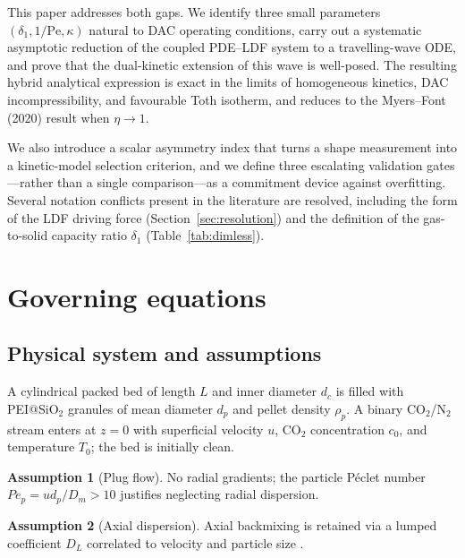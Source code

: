 \documentclass[a4paper]{amsart}
\theoremstyle{definition}
\newtheorem{assumption}{Assumption}
\begin{document}
This paper addresses both gaps.  We identify three small parameters
$(\delta_1, 1/\mathrm{Pe}, \kappa)$ natural to DAC operating conditions, carry out
a systematic asymptotic reduction of the coupled PDE--LDF system to a
travelling-wave ODE, and prove that the dual-kinetic extension of this wave
is well-posed.  The resulting hybrid analytical expression is exact in the
limits of homogeneous kinetics, DAC incompressibility, and favourable Toth
isotherm, and reduces to the Myers--Font (2020) result \cite{MyersFont2020}
when $\eta\to1$.

We also introduce a scalar asymmetry index that turns a shape measurement
into a kinetic-model selection criterion, and we define three escalating
validation gates---rather than a single comparison---as a commitment device
against overfitting.  Several notation conflicts present in the literature are
resolved, including the form of the LDF driving force
(Section~\ref{sec:resolution}) and the definition of the gas-to-solid
capacity ratio $\delta_1$ (Table~\ref{tab:dimless}).

\section{Governing equations}

\subsection{Physical system and assumptions}

A cylindrical packed bed of length $L$ and inner diameter $d_c$ is filled
with PEI@SiO$_2$ granules of mean diameter $d_p$ and pellet density $\rho_p$.
A binary CO$_2$/N$_2$ stream enters at $z=0$ with superficial velocity $u$,
CO$_2$ concentration $c_0$, and temperature $T_0$; the bed is initially
clean.

\begin{assumption}[Plug flow]\label{ass:plug}
No radial gradients; the particle P\'eclet number $Pe_p = ud_p/D_m > 10$
justifies neglecting radial dispersion.
\end{assumption}

\begin{assumption}[Axial dispersion]\label{ass:ax}
Axial backmixing is retained via a lumped coefficient $D_L$ correlated to
velocity and particle size \cite{Stampi2024}.
\end{assumption}
\end{document}

